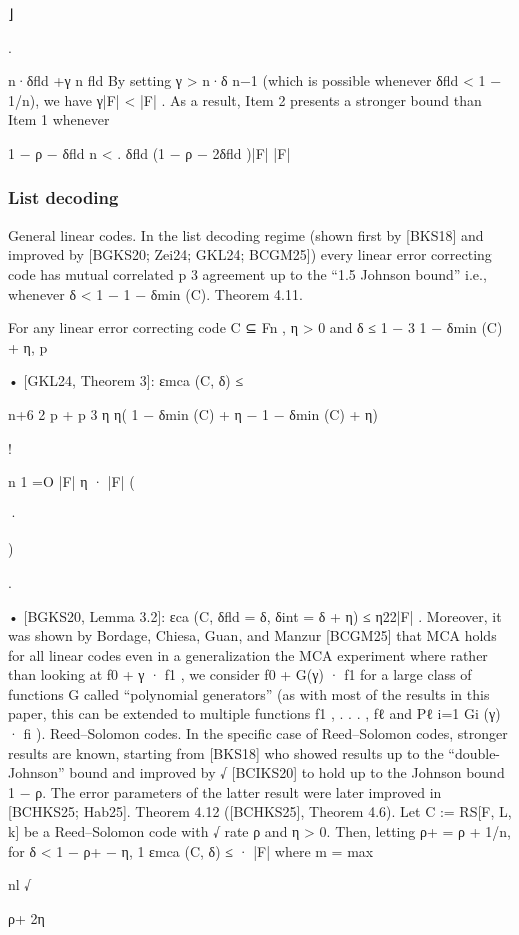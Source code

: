 \documentclass[11pt]{article}
\begin{document}
⌋

.

n·δfld +γ
n
fld
By setting γ > n·δ
n−1 (which is possible whenever δfld < 1 − 1/n), we have
γ|F| < |F| . As a result,
Item 2 presents a stronger bound than Item 1 whenever

1 − ρ − δfld
n
<
.
δfld (1 − ρ − 2δfld )|F|
|F|

\subsubsection{List decoding}



General linear codes. In the list decoding regime (shown first by [BKS18] and improved by
[BGKS20; Zei24; GKL24; BCGM25]) every linear error correcting
code has mutual correlated
p
3
agreement up to the “1.5 Johnson bound” i.e., whenever δ < 1 − 1 − δmin (C).
Theorem 4.11.

For any linear error correcting code C ⊆ Fn , η > 0 and δ ≤ 1 − 3 1 − δmin (C) + η,
p

• [GKL24, Theorem 3]:
εmca (C, δ) ≤

n+6
2
p
+ p
3
η
η( 1 − δmin (C) + η − 1 − δmin (C) + η)

!

n
1
=O
|F|
η · |F|
(

·

)

.

• [BGKS20, Lemma 3.2]: εca (C, δfld = δ, δint = δ + η) ≤ η22|F| .
Moreover, it was shown by Bordage, Chiesa, Guan, and Manzur [BCGM25] that MCA holds
for all linear codes even in a generalization the MCA experiment where rather than looking at
f0 + γ · f1 , we consider f0 + G(γ) · f1 for a large class of functions G called “polynomial generators”
(as with most of the results in this paper, this can be extended to multiple functions f1 , . . . , fℓ and
Pℓ
i=1 Gi (γ) · fi ).
Reed–Solomon codes. In the specific case of Reed–Solomon codes, stronger results are known,
starting from [BKS18] who showed results up to the “double-Johnson” bound and improved by
√
[BCIKS20] to hold up to the Johnson bound 1 − ρ. The error parameters of the latter result were
later improved in [BCHKS25; Hab25].
Theorem 4.12 ([BCHKS25], Theorem 4.6). Let C := RS[F, L, k] be a Reed–Solomon code with
√
rate ρ and η > 0. Then, letting ρ+ = ρ + 1/n, for δ < 1 − ρ+ − η,
1
εmca (C, δ) ≤
·
|F|
where m = max

nl √

ρ+
2η
\end{document}
